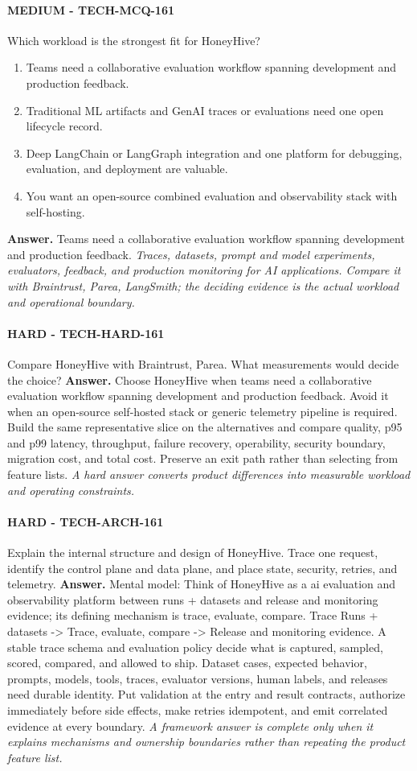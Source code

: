 \paragraph{MEDIUM - TECH-MCQ-161} Which workload is the strongest fit for HoneyHive?
\begin{enumerate}[label=\Alph*.]
\item Teams need a collaborative evaluation workflow spanning development and production feedback.
\item Traditional ML artifacts and GenAI traces or evaluations need one open lifecycle record.
\item Deep LangChain or LangGraph integration and one platform for debugging, evaluation, and deployment are valuable.
\item You want an open-source combined evaluation and observability stack with self-hosting.
\end{enumerate}
\textbf{Answer.} Teams need a collaborative evaluation workflow spanning development and production feedback.
\textit{Traces, datasets, prompt and model experiments, evaluators, feedback, and production monitoring for AI applications. Compare it with Braintrust, Parea, LangSmith; the deciding evidence is the actual workload and operational boundary.}
\paragraph{HARD - TECH-HARD-161} Compare HoneyHive with Braintrust, Parea. What measurements would decide the choice?
\textbf{Answer.} Choose HoneyHive when teams need a collaborative evaluation workflow spanning development and production feedback. Avoid it when an open-source self-hosted stack or generic telemetry pipeline is required. Build the same representative slice on the alternatives and compare quality, p95 and p99 latency, throughput, failure recovery, operability, security boundary, migration cost, and total cost. Preserve an exit path rather than selecting from feature lists.
\textit{A hard answer converts product differences into measurable workload and operating constraints.}
\paragraph{HARD - TECH-ARCH-161} Explain the internal structure and design of HoneyHive. Trace one request, identify the control plane and data plane, and place state, security, retries, and telemetry.
\textbf{Answer.} Mental model: Think of HoneyHive as a ai evaluation and observability platform between runs + datasets and release and monitoring evidence; its defining mechanism is trace, evaluate, compare. Trace Runs + datasets -> Trace, evaluate, compare -> Release and monitoring evidence. A stable trace schema and evaluation policy decide what is captured, sampled, scored, compared, and allowed to ship. Dataset cases, expected behavior, prompts, models, tools, traces, evaluator versions, human labels, and releases need durable identity. Put validation at the entry and result contracts, authorize immediately before side effects, make retries idempotent, and emit correlated evidence at every boundary.
\textit{A framework answer is complete only when it explains mechanisms and ownership boundaries rather than repeating the product feature list.}
